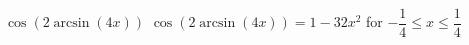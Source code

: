 {$\cos(2 \arcsin(4x))$}
{ $\cos(2 \arcsin(4x)) = 1 - 32x^2$ for $-\dfrac{1}{4} \leq x \leq \dfrac{1}{4}$}
